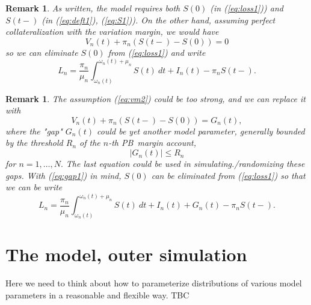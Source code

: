 \documentclass{article}
\newtheorem{remark}[theorem]{Remark}
\begin{document}
\begin{remark}
As written, the model requires both $S(0)$ (in (\ref{eq:loss1})) and $S(t-)$
(in (\ref{eq:deft1}), (\ref{eq:S1})). On the other hand, assuming perfect
collateralization with the variation margin, we would have%
\begin{equation}
V_{n}(t)+\pi _{n}\left( S(t-)-S(0)\right) =0  \label{eq:vm2}
\end{equation}%
so we can eliminate $S(0)$ from (\ref{eq:loss1}) and write%
\begin{equation*}
L_{n}=\frac{\pi _{n}}{\mu _{n}}\int_{\omega _{n}(t)}^{\omega _{n}(t)+\mu
_{n}}S(t)~dt+I_{n}(t)-\pi _{n}S(t-).
\end{equation*}
\end{remark}

\begin{remark}
The assumption (\ref{eq:vm2}) could be too strong, and we can replace it
with 
\begin{equation}
V_{n}(t)+\pi _{n}\left( S(t-)-S(0)\right) =G_{n}(t),  \label{eq:gap1}
\end{equation}%
where the "gap" $G_{n}(t)$ could be yet another model parameter, generally
bounded by the threshold $R_{n}$ of the $n$-th PB\ margin account,%
\begin{equation*}
\left\vert G_{n}(t)\right\vert \leq R_{n}
\end{equation*}%
for $n=1,\dots ,N.$ The last equation could be used in
simulating./randomizing these gaps. With (\ref{eq:gap1}) in mind, $S(0)$ can
be eliminated from (\ref{eq:loss1}) so that we can be write%
\begin{equation*}
L_{n}=\frac{\pi _{n}}{\mu _{n}}\int_{\omega _{n}(t)}^{\omega _{n}(t)+\mu
_{n}}S(t)~dt+I_{n}(t)+G_{n}(t)-\pi _{n}S(t-).
\end{equation*}
\end{remark}

\section{The model, outer simulation}

Here we need to think about how to parameterize distributions of various
model parameters in a reasonable and flexible way. TBC
\end{document}
